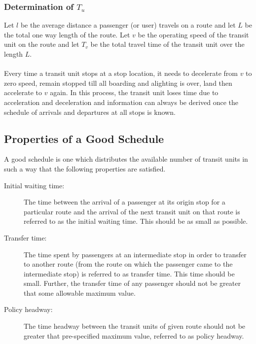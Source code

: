 \subsubsection{Determination of $T_u$}
Let $l$ be the average distance a passenger (or user) travels on a route and let $L$ be the total one way length of the route. Let $v$ be the operating speed of the transit unit on the route and let $T_v$ be the total travel time of the transit unit over the length $L$.\\\\
Every time a transit unit stops at a stop location, it needs to decelerate from $v$ to zero speed, remain stopped till all boarding and alighting is over, land then accelerate to $v$ again. In this process, the transit unit loses time due to acceleration and deceleration and information can always be derived once the schedule of arrivals and departures at all stops is known. 
\subsection{Properties of a Good Schedule}
A good schedule is one which distributes the available number of transit units in such a way that the following properties are satisfied.
\begin{description}
	\item [Initial waiting time:] The time between the arrival of a passenger at its origin stop for a particular route and the arrival of the next transit unit on that route is referred to as the initial waiting time. This should be as small as possible.
	\item [Transfer time:] The time spent by passengers at an intermediate stop in order to transfer to another route (from the route on which the passenger came to the intermediate stop) is referred to as transfer time. This time should be small. Further, the transfer time of any passenger should not be greater that some allowable maximum value.
	\item [Policy headway:] The time headway between the transit units of given route should not be greater that pre-specified maximum value, referred to as policy headway.
\end{description}
%
